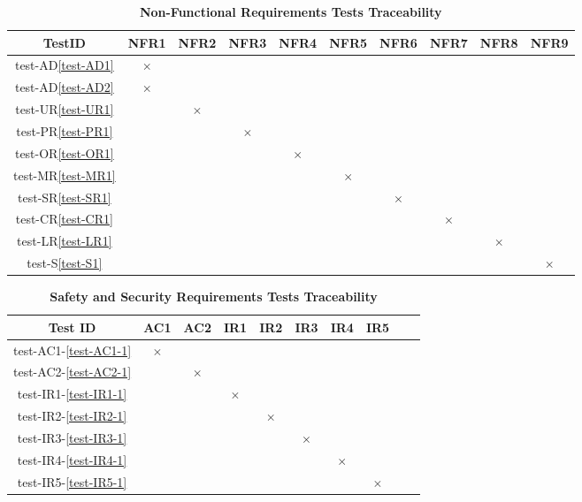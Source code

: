 \documentclass[12pt, titlepage]{article}
\begin{document}
\begin{landscape}
\begin{table} [H]
  \centering
  \begin{tabular}{|c|c|c|c|c|c|c|c|c|c|}
    \hline
    TestID & NFR1 & NFR2 & NFR3 & NFR4 & NFR5 & NFR6 & NFR7 & NFR8 & NFR9 \\
    \hline
    test-AD\ref{test-AD1} & $\times$ & & & & & & & & \\
    \hline
    test-AD\ref{test-AD2} & $\times$ & & & & & & & & \\
    \hline
    test-UR\ref{test-UR1} & & $\times$ & & & & & & &  \\
    \hline
    test-PR\ref{test-PR1} & & & $\times$ & & & & & & \\
    \hline
    test-OR\ref{test-OR1} & & & & $\times$ & & & & &  \\
    \hline
    test-MR\ref{test-MR1} & & & & & $\times$ & & & &\\
    \hline
    test-SR\ref{test-SR1} & & & & & & $\times$ & & & \\
    \hline
    test-CR\ref{test-CR1} & & & & & & & $\times$ & &\\
    \hline
    test-LR\ref{test-LR1} & & & & & & & & $\times$ &\\
    \hline
    test-S\ref{test-S1} & & & & & & & & & $\times$ \\
    \hline
  \end{tabular}
\caption{\bf Non-Functional Requirements Tests Traceability} \label{tab:nfr-test-traceability}
\end{table}

\begin{table} [H]
  \centering
  \begin{tabular}{|c|c|c|c|c|c|c|c|c|c|}
  \hline
  Test ID & AC1 & AC2 & IR1 & IR2 & IR3 & IR4 & IR5 \\
  \hline
  test-AC1-\ref{test-AC1-1} & $\times$ & & & & & & \\
  \hline
  test-AC2-\ref{test-AC2-1} & & $\times$ & & & & &  \\
  \hline
  test-IR1-\ref{test-IR1-1} & & & $\times$ & & & &  \\
  \hline
  test-IR2-\ref{test-IR2-1}  & & & & $\times$ & & & \\
  \hline
  test-IR3-\ref{test-IR3-1}  & & & & & $\times$ & & \\
  \hline
  test-IR4-\ref{test-IR4-1}  & & & & & & $\times$ & \\
  \hline
  test-IR5-\ref{test-IR5-1}  & & & & & & & $\times$  \\
  \hline
\end{tabular}
\caption{\bf Safety and Security Requirements Tests Traceability} \label{tab:sns-test-traceability}
\end{table}

\end{landscape}
\newpage
\end{document}
